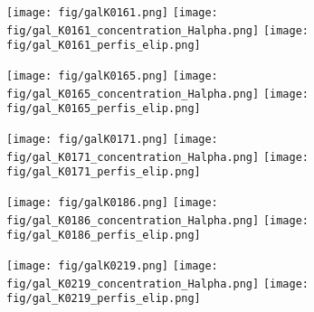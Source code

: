 \begin{figure}[!ht]
\begin{center}
\setcaptionmargin{1cm}
\texttt{[image: fig/galK0161.png]}
\texttt{[image: fig/gal\_K0161\_concentration\_Halpha.png]}
\texttt{[image: fig/gal\_K0161\_perfis\_elip.png]}
\end{center}
\end{figure}


\begin{figure}[!ht]
\begin{center}
\setcaptionmargin{1cm}
\texttt{[image: fig/galK0165.png]}
\texttt{[image: fig/gal\_K0165\_concentration\_Halpha.png]}
\texttt{[image: fig/gal\_K0165\_perfis\_elip.png]}
\end{center}
\end{figure}


\begin{figure}[!ht]
\begin{center}
\setcaptionmargin{1cm}
\texttt{[image: fig/galK0171.png]}
\texttt{[image: fig/gal\_K0171\_concentration\_Halpha.png]}
\texttt{[image: fig/gal\_K0171\_perfis\_elip.png]}
\end{center}
\end{figure}


\begin{figure}[!ht]
\begin{center}
\setcaptionmargin{1cm}
\texttt{[image: fig/galK0186.png]}
\texttt{[image: fig/gal\_K0186\_concentration\_Halpha.png]}
\texttt{[image: fig/gal\_K0186\_perfis\_elip.png]}
\end{center}
\end{figure}


\begin{figure}[!ht]
\begin{center}
\setcaptionmargin{1cm}
\texttt{[image: fig/galK0219.png]}
\texttt{[image: fig/gal\_K0219\_concentration\_Halpha.png]}
\texttt{[image: fig/gal\_K0219\_perfis\_elip.png]}
\end{center}
\end{figure}


